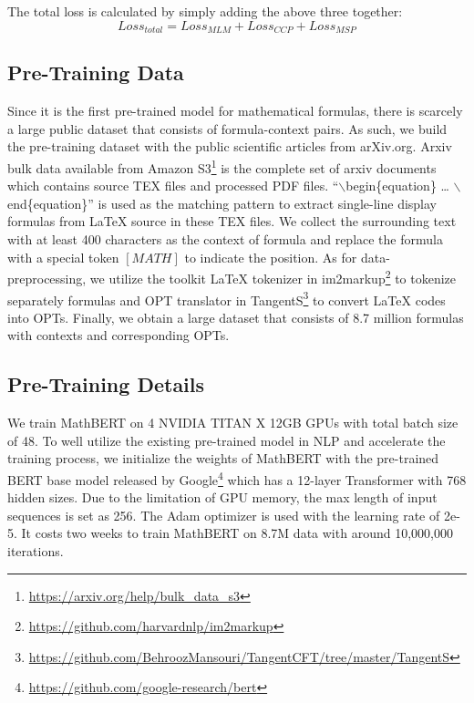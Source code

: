 \documentclass{article}
\begin{document}
The total loss is calculated by simply adding the above three together:
\begin{equation}
    Loss_{total} = Loss_{MLM} + Loss_{CCP} + Loss_{MSP}
\end{equation}

\subsection{Pre-Training Data}\label{subsection:pre-training_data}

Since it is the first pre-trained model for mathematical formulas, there is scarcely a large public dataset that consists of formula-context pairs. As such, we build the pre-training dataset with the public scientific articles from arXiv.org. Arxiv bulk data available from Amazon S3\footnote{\url{https://arxiv.org/help/bulk_data_s3}} is the complete set of arxiv documents which contains source TEX files and processed PDF files. “$\backslash$begin\{equation\} … $\backslash$end\{equation\}” is used as the matching pattern to extract single-line display formulas from \LaTeX{} source in these TEX files. We collect the surrounding text with at least 400 characters as the context of formula and replace the formula with a special token $[MATH]$ to indicate the position. As for data-preprocessing, we utilize the toolkit \LaTeX{} tokenizer in im2markup\footnote{\url{https://github.com/harvardnlp/im2markup}} to tokenize separately formulas and OPT translator in TangentS\footnote{\url{https://github.com/BehroozMansouri/TangentCFT/tree/master/TangentS}} to convert \LaTeX{} codes into OPTs. Finally, we obtain a large dataset that consists of 8.7 million formulas with contexts and corresponding OPTs.

\subsection{Pre-Training Details}

We train MathBERT on 4 NVIDIA TITAN X 12GB GPUs with total batch size of 48. To well utilize the existing pre-trained model in NLP and accelerate the training process, we initialize the weights of MathBERT with the pre-trained BERT base model released by Google\footnote{\url{https://github.com/google-research/bert}} which has a 12-layer Transformer with 768 hidden sizes. Due to the limitation of GPU memory, the max length of input sequences is set as 256. The Adam optimizer is used with the learning rate of 2e-5. It costs two weeks to train MathBERT on 8.7M data with around 10,000,000 iterations.
\end{document}
